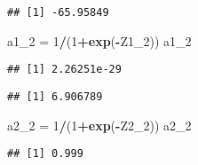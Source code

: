 \documentclass[
]{book}
\newenvironment{Shaded}{\begin{snugshade}}{\end{snugshade}}
\newcommand{\DecValTok}[1]{\textcolor[rgb]{0.00,0.00,0.81}{#1}}
\newcommand{\KeywordTok}[1]{\textcolor[rgb]{0.13,0.29,0.53}{\textbf{#1}}}
\newcommand{\NormalTok}[1]{#1}
\newcommand{\OperatorTok}[1]{\textcolor[rgb]{0.81,0.36,0.00}{\textbf{#1}}}
\newcommand{\StringTok}[1]{\textcolor[rgb]{0.31,0.60,0.02}{#1}}
\begin{document}
\begin{verbatim}
## [1] -65.95849
\end{verbatim}

\begin{Shaded}
\begin{Highlighting}[]
\NormalTok{a1_}\DecValTok{2}\NormalTok{ =}\StringTok{ }\DecValTok{1}\OperatorTok{/}\NormalTok{(}\DecValTok{1}\OperatorTok{+}\KeywordTok{exp}\NormalTok{(}\OperatorTok{-}\NormalTok{Z1_}\DecValTok{2}\NormalTok{))}
\NormalTok{a1_}\DecValTok{2}
\end{Highlighting}
\end{Shaded}

\begin{verbatim}
## [1] 2.26251e-29
\end{verbatim}

\begin{Shaded}
\end{Shaded}

\begin{verbatim}
## [1] 6.906789
\end{verbatim}

\begin{Shaded}
\begin{Highlighting}[]
\NormalTok{a2_}\DecValTok{2}\NormalTok{ =}\StringTok{ }\DecValTok{1}\OperatorTok{/}\NormalTok{(}\DecValTok{1}\OperatorTok{+}\KeywordTok{exp}\NormalTok{(}\OperatorTok{-}\NormalTok{Z2_}\DecValTok{2}\NormalTok{))}
\NormalTok{a2_}\DecValTok{2}
\end{Highlighting}
\end{Shaded}

\begin{verbatim}
## [1] 0.999
\end{verbatim}

\begin{Shaded}
\end{Shaded}
\end{document}
